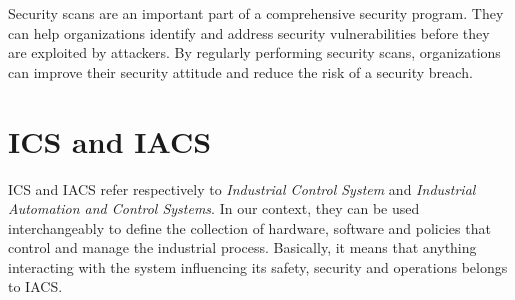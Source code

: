Security scans are an important part of a comprehensive security program. They can help organizations identify and address security vulnerabilities before they are exploited by attackers. By regularly performing security scans, organizations can improve their security attitude and reduce the risk of a security breach.

\section{ICS and IACS}

ICS and IACS refer respectively to \textit{Industrial Control System} and \textit{Industrial Automation and Control Systems}. In our context, they can be used interchangeably to define the collection of hardware, software and policies that control and manage the industrial process. Basically, it means that anything interacting with the system influencing its safety, security and operations belongs to IACS.~\cite{ics-or-iacs}

